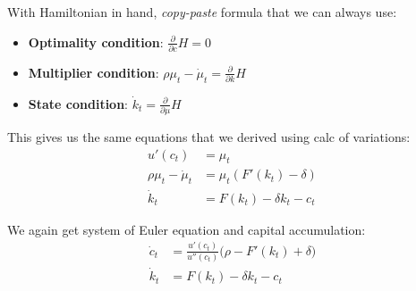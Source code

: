 \documentclass[11pt, aspectratio=169]{beamer}
\newenvironment{witemize}{\itemize\addtolength{\itemsep}{10pt}}{\enditemize}
\begin{document}
\begin{frame}{}
\begin{witemize}
\item With Hamiltonian in hand, \textit{copy-paste} formula that we can always use:

\begin{itemize}
\item \textbf{Optimality condition}: $\frac{\partial}{\partial c} H = 0$
\item \textbf{Multiplier condition}: $\rho \mu_t - \dot \mu_t = \frac{\partial}{\partial k} H$
\item \textbf{State condition}: $\dot k_t = \frac{\partial}{\partial \mu} H$
\end{itemize}

\item This gives us the same equations that we derived using calc of variations:
\begin{align*}
	u'(c_t) &= \mu_t \\
	\rho \mu_t - \dot \mu_t &= \mu_t (F'(k_t) - \delta) \\
	\dot k_t &= F(k_t) - \delta k_t - c_t
\end{align*}

\item We again get system of Euler equation and capital accumulation:
\begin{align*}
	\dot c_t &= \frac{u'(c_t)}{u''(c_t)} \Big( \rho - F'(k_t) + \delta \Big) \\
	\dot k_t &= F(k_t) - \delta k_t - c_t
\end{align*}

\end{witemize}
\end{frame}
\end{document}
